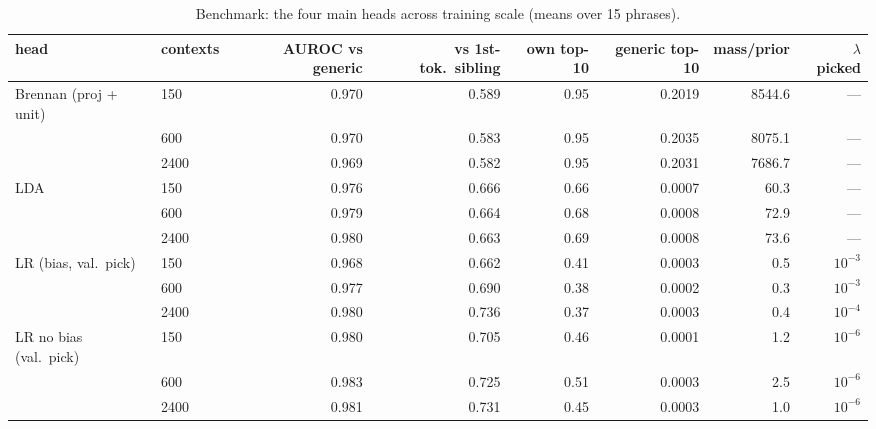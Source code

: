 \begin{table}[t]
\centering
\footnotesize
\caption{Benchmark: the four main heads across training scale (means over 15 phrases).}
\label{tab:bench_scale}
\begin{adjustbox}{max width=\textwidth}
\begin{tabular}{llrrrrrr}
\toprule
head & contexts & AUROC vs generic & vs 1st-tok.\ sibling & own top-10 & generic top-10 & mass/prior & $\lambda$ picked \\
\midrule
Brennan (proj + unit) & 150 & 0.970 & 0.589 & 0.95 & 0.2019 & 8544.6 & --- \\
 & 600 & 0.970 & 0.583 & 0.95 & 0.2035 & 8075.1 & --- \\
 & 2400 & 0.969 & 0.582 & 0.95 & 0.2031 & 7686.7 & --- \\
\midrule
LDA & 150 & 0.976 & 0.666 & 0.66 & 0.0007 & 60.3 & --- \\
 & 600 & 0.979 & 0.664 & 0.68 & 0.0008 & 72.9 & --- \\
 & 2400 & 0.980 & 0.663 & 0.69 & 0.0008 & 73.6 & --- \\
\midrule
LR (bias, val.\ pick) & 150 & 0.968 & 0.662 & 0.41 & 0.0003 & 0.5 & $10^{-3}$ \\
 & 600 & 0.977 & 0.690 & 0.38 & 0.0002 & 0.3 & $10^{-3}$ \\
 & 2400 & 0.980 & 0.736 & 0.37 & 0.0003 & 0.4 & $10^{-4}$ \\
\midrule
LR no bias (val.\ pick) & 150 & 0.980 & 0.705 & 0.46 & 0.0001 & 1.2 & $10^{-6}$ \\
 & 600 & 0.983 & 0.725 & 0.51 & 0.0003 & 2.5 & $10^{-6}$ \\
 & 2400 & 0.981 & 0.731 & 0.45 & 0.0003 & 1.0 & $10^{-6}$ \\
\bottomrule
\end{tabular}
\end{adjustbox}
\end{table}